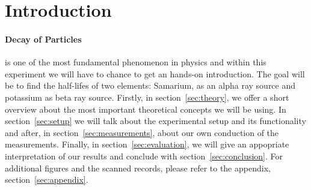 \section{Introduction}
\label{sec:introduction}
\paragraph{Decay of Particles} is one of the most fundamental phenomenon
in physics and within this experiment we will have to chance
to get an hands-on introduction. The goal will be to 
find the half-lifes of two elements: Samarium, as an alpha ray
source and potassium as beta ray source. Firstly, in section~\ref{sec:theory}, 
we offer a short overview about the most important theoretical concepts we will be using.
In section~\ref{sec:setup} we will talk about the experimental setup and its 
functionality and after, in section~\ref{sec:measurements}, about our
own conduction of the measurements. Finally, in section~\ref{sec:evaluation},
we will give an appopriate interpretation of our results and conclude with
section~\ref{sec:conclusion}. For additional figures and the scanned records,
please refer to the appendix, section~\ref{sec:appendix}.
